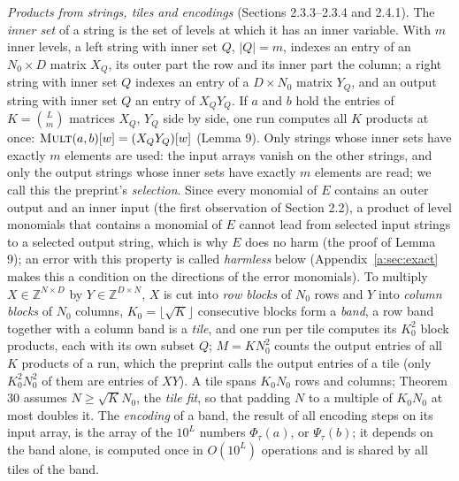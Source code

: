 \documentclass[11pt]{article}
\theoremstyle{definition}
\theoremstyle{remark}
\newcommand{\Z}{\mathbb{Z}}
\newcommand{\Mult}{\textnormal{\textsc{Mult}}}
\newcommand{\Nz}{N_0}
\begin{document}
\emph{Products from strings, tiles and encodings} (Sections 2.3.3--2.3.4 and 2.4.1). The \emph{inner set} of a string is the set of levels at which it has an inner variable. With $m$ inner levels, a left string with inner set $Q$, $|Q|=m$, indexes an entry of an $\Nz\times D$ matrix $X_Q$, its outer part the row and its inner part the column; a right string with inner set $Q$ indexes an entry of a $D\times\Nz$ matrix $Y_Q$, and an output string with inner set $Q$ an entry of $X_QY_Q$. If $a$ and $b$ hold the entries of $K=\binom Lm$ matrices $X_Q$, $Y_Q$ side by side, one run computes all $K$ products at once: $\Mult(a,b)[w]=(X_QY_Q)[w]$ (Lemma 9). Only strings whose inner sets have exactly $m$ elements are used: the input arrays vanish on the other strings, and only the output strings whose inner sets have exactly $m$ elements are read; we call this the preprint's \emph{selection}. Since every monomial of $E$ contains an outer output and an inner input (the first observation of Section 2.2), a product of level monomials that contains a monomial of $E$ cannot lead from selected input strings to a selected output string, which is why $E$ does no harm (the proof of Lemma 9); an error with this property is called \emph{harmless} below (Appendix~\ref{a:sec:exact} makes this a condition on the directions of the error monomials). To multiply $X\in\Z^{N\times D}$ by $Y\in\Z^{D\times N}$, $X$ is cut into \emph{row blocks} of $\Nz$ rows and $Y$ into \emph{column blocks} of $\Nz$ columns, $K_0=\lfloor\sqrt K\rfloor$ consecutive blocks form a \emph{band}, a row band together with a column band is a \emph{tile}, and one run per tile computes its $K_0^2$ block products, each with its own subset $Q$; $M=K\Nz^2$ counts the output entries of all $K$ products of a run, which the preprint calls the output entries of a tile (only $K_0^2\Nz^2$ of them are entries of $XY$). A tile spans $K_0\Nz$ rows and columns; Theorem 30 assumes $N\ge\sqrt K\Nz$, the \emph{tile fit}, so that padding $N$ to a multiple of $K_0\Nz$ at most doubles it. The \emph{encoding} of a band, the result of all encoding steps on its input array, is the array of the $10^L$ numbers $\Phi_\tau(a)$, or $\Psi_\tau(b)$; it depends on the band alone, is computed once in $O(10^L)$ operations and is shared by all tiles of the band.
\end{document}
